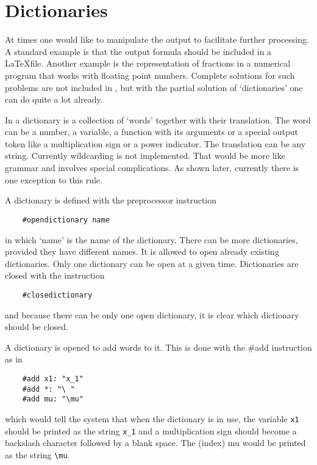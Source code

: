 
\chapter{Dictionaries}
\label{dictionaries}

At times one would like to manipulate the output to facilitate further 
processing. A standard example is that the output formula should be 
included in a \LaTeX file. Another example is the representation of 
fractions in a numerical program that works with floating point numbers. 
Complete solutions for such problems are not included in \FORM, but with 
the partial solution of `dictionaries' one can do quite 
a lot already.

In \FORM a dictionary is a collection of `words' together with 
their translation. The word can be a number, a variable, 
a function with its arguments or a special output token like a 
multiplication sign or a power indicator. The translation can be any 
string. Currently wildcarding is not implemented. That would be more like 
grammar and involves special complications. As shown later, currently there 
is one exception to this rule.

A dictionary is defined with the preprocessor 
instruction
\begin{verbatim}
    #opendictionary name
\end{verbatim}
in which `name' is the name of the dictionary. There can be more 
dictionaries, provided they have different names. It is allowed to open 
already existing dictionaries. Only one dictionary can be open at a given 
time. Dictionaries are closed with the instruction
\begin{verbatim}
    #closedictionary
\end{verbatim}
and because there can be only one open dictionary, it is clear which 
dictionary should be closed.

A dictionary is opened to add words to it. This is done with the \#add 
instruction as in
\begin{verbatim}
    #add x1: "x_1"
    #add *: "\ "
    #add mu: "\mu"
\end{verbatim}
which would tell the system that when the dictionary is in use, the 
variable \verb:x1: should be printed as the string \verb:x_1: and a 
multiplication sign should become a backslash character followed by a 
blank space. The (index) mu would be printed as the string \verb:\mu:.

